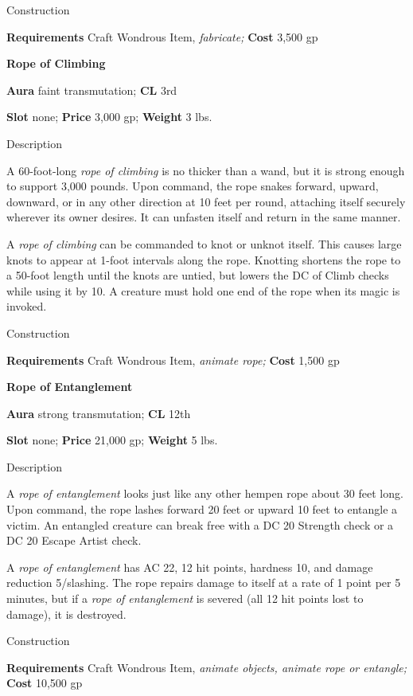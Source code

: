 Construction
				
\textbf{Requirements} Craft Wondrous Item,\textit{ fabricate;}\textbf{ Cost }3,500 gp
				
\textbf{Rope of Climbing}
				
\textbf{Aura} faint transmutation;\textbf{ CL }3rd
				
\textbf{Slot} none; \textbf{Price} 3,000 gp; \textbf{Weight} 3 lbs.
				
Description
				
A 60-foot-long \textit{rope of climbing} is no thicker than a wand, but it is strong enough to support 3,000 pounds. Upon command, the rope snakes forward, upward, downward, or in any other direction at 10 feet per round, attaching itself securely wherever its owner desires. It can unfasten itself and return in the same manner.
				
A \textit{rope of climbing} can be commanded to knot or unknot itself. This causes large knots to appear at 1-foot intervals along the rope. Knotting shortens the rope to a 50-foot length until the knots are untied, but lowers the DC of Climb checks while using it by 10. A creature must hold one end of the rope when its magic is invoked. 
				
Construction
				
\textbf{Requirements} Craft Wondrous Item,\textit{ animate rope;}\textbf{ Cost }1,500 gp
				
\textbf{Rope of Entanglement}
				
\textbf{Aura} strong transmutation;\textbf{ CL }12th
				
\textbf{Slot} none; \textbf{Price} 21,000 gp; \textbf{Weight} 5 lbs.
				
Description
				
A \textit{rope of entanglement} looks just like any other hempen rope about 30 feet long. Upon command, the rope lashes forward 20 feet or upward 10 feet to entangle a victim. An entangled creature can break free with a DC 20 Strength check or a DC 20 Escape Artist check.
				
A \textit{rope of entanglement} has AC 22, 12 hit points, hardness 10, and damage reduction 5/slashing. The rope repairs damage to itself at a rate of 1 point per 5 minutes, but if a \textit{rope of entanglement} is severed (all 12 hit points lost to damage), it is destroyed. 
				
Construction
				
\textbf{Requirements} Craft Wondrous Item,\textit{ animate objects, animate rope or entangle;}\textbf{ Cost }10,500 gp
				
